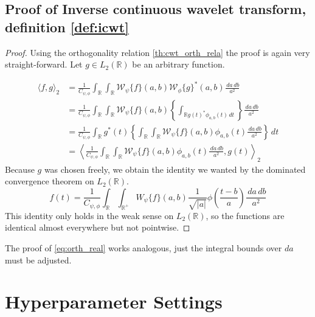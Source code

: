 \subsection{Proof of Inverse continuous wavelet transform, definition \ref{def:icwt}} \label{proof:icwt}

\begin{proof}
    Using the orthogonality relation \ref{th:cwt_orth_rela} the proof is again very straight-forward. Let $g \in L_2(\mathbb{R})$ be an arbitrary function.

    \begin{align}
         \langle f, g \rangle_2 &= \frac{1}{C_{\psi, \phi}} \int_{\mathbb{R}} \int_{\mathbb{R}} \mathscr{W}_{\psi}\{f\}(a,b) \mathscr{W}_{\phi}\{g\}^{\ast}(a,b) \frac{\,da \,db}{a^2} \\
                                &= \frac{1}{C_{\psi, \phi}} \int_{\mathbb{R}} \int_{\mathbb{R}} \mathscr{W}_{\psi}\{f\}(a,b) \left\{ \int_{\mathbb{R} g(t)^{\ast} \phi_{a,b}(t)\,dt} \right\} \frac{\,da \,db}{a^2} \\
                                &= \frac{1}{C_{\psi, \phi}} \int_{\mathbb{R}} g^{\ast}(t) \left\{ \int_{\mathbb{R}} \int_{\mathbb{R}} \mathscr{W}_{\psi}\{f\}(a,b) \phi_{a,b}(t) \frac{\,da \,db}{a^2} \right\} \,dt \\
                                &= \left\langle \frac{1}{C_{\psi, \phi}} \int_{\mathbb{R}} \int_{\mathbb{R}} \mathscr{W}_{\psi}\{f\}(a,b) \phi_{a,b}(t) \frac{\,da \,db}{a^2}, g(t) \right\rangle_2
    \end{align}
    Because $g$ was chosen freely, we obtain the identity we wanted by the dominated convergence theorem on $L_2(\mathbb{R})$.
    \begin{equation*}
        f(t) = \frac{1}{C_{\psi, \phi}} \int_{\mathbb{R}} \int_{\mathbb{R^{+}}} W_{\psi}\{f\}(a, b) \frac{1}{\sqrt{|a|}} \phi \left(\frac{t - b}{a}\right)  \frac{\,da \,db}{a^2}
    \end{equation*}
    This identity only holds in the weak sense on $L_2(\mathbb{R})$, so the functions are identical almost everywhere but not pointwise.
\end{proof}
The proof of \ref{eq:orth_real} works analogous, just the integral bounds over $da$ must be adjusted.


\section{Hyperparameter Settings}




